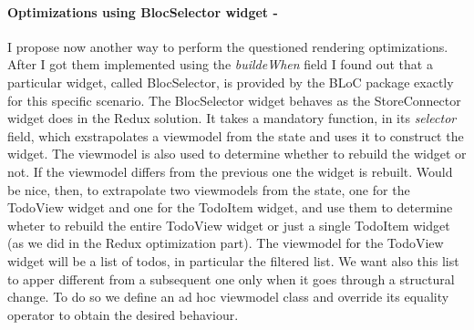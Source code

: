 \paragraph{Optimizations using BlocSelector widget - }\label{subpar:todo_app_bloc_core_state}
I propose now another way to perform the questioned	rendering optimizations. After I got them implemented using the \textit{buildeWhen} field I found out that a particular widget, called BlocSelector, is provided by the BLoC package exactly for this specific scenario. The BlocSelector widget behaves as the StoreConnector widget does in the Redux solution. It takes a mandatory function, in its \textit{selector} field, which exstrapolates a viewmodel from the state and uses it to construct the widget. The viewmodel is also used to determine whether to rebuild the widget or not. If the viewmodel differs from the previous one the widget is rebuilt. Would be nice, then, to extrapolate two viewmodels from the state, one for the TodoView widget and one for the TodoItem widget, and use them to determine wheter to rebuild the entire TodoView widget or just a single TodoItem widget (as we did in the Redux optimization part). The viewmodel for the TodoView widget will be a list of todos, in particular the filtered list. We want also this list to apper different from a subsequent one only when it goes through a structural change.  To do so we define an ad hoc viewmodel class and override its equality operator to obtain the desired behaviour.

